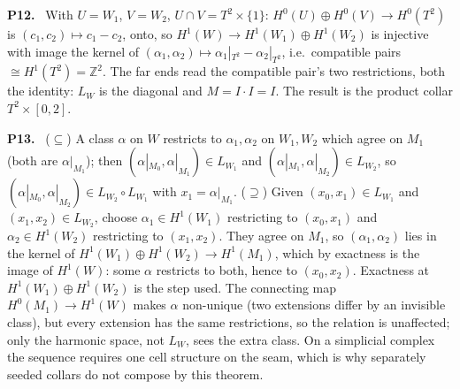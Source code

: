 \documentclass[11pt]{article}
\newcommand{\Z}{\mathbb{Z}}
\newenvironment{solution}[1]{\medskip\noindent\textbf{P#1.}\ }{\par\medskip}
\begin{document}
\begin{solution}{12}
With $U = W_1$, $V = W_2$, $U\cap V = T^2\times\{1\}$: $H^0(U)\oplus H^0(V)\to H^0(T^2)$
is $(c_1,c_2)\mapsto c_1-c_2$, onto, so $H^1(W)\to H^1(W_1)\oplus H^1(W_2)$ is
injective with image the kernel of $(\alpha_1,\alpha_2)\mapsto\alpha_1|_{T^2}-\alpha_2|_{T^2}$,
i.e.\ compatible pairs $\cong H^1(T^2) = \Z^2$. The far ends read the compatible
pair's two restrictions, both the identity: $L_W$ is the diagonal and
$M = I\cdot I = I$. The result is the product collar $T^2\times[0,2]$.
\end{solution}

\begin{solution}{13}
($\subseteq$) A class $\alpha$ on $W$ restricts to $\alpha_1,\alpha_2$ on $W_1,W_2$
which agree on $M_1$ (both are $\alpha|_{M_1}$); then $(\alpha|_{M_0},\alpha|_{M_1})\in L_{W_1}$
and $(\alpha|_{M_1},\alpha|_{M_2})\in L_{W_2}$, so $(\alpha|_{M_0},\alpha|_{M_2})\in L_{W_2}\circ L_{W_1}$
with $x_1 = \alpha|_{M_1}$. ($\supseteq$) Given $(x_0,x_1)\in L_{W_1}$ and $(x_1,x_2)\in L_{W_2}$,
choose $\alpha_1\in H^1(W_1)$ restricting to $(x_0,x_1)$ and $\alpha_2\in H^1(W_2)$
restricting to $(x_1,x_2)$. They agree on $M_1$, so $(\alpha_1,\alpha_2)$ lies in
the kernel of $H^1(W_1)\oplus H^1(W_2)\to H^1(M_1)$, which by exactness is the
image of $H^1(W)$: some $\alpha$ restricts to both, hence to $(x_0,x_2)$. Exactness
at $H^1(W_1)\oplus H^1(W_2)$ is the step used. The connecting map
$H^0(M_1)\to H^1(W)$ makes $\alpha$ non-unique (two extensions differ by an
invisible class), but every extension has the same restrictions, so the
relation is unaffected; only the harmonic space, not $L_W$, sees the extra
class. On a simplicial complex the sequence requires one cell structure on
the seam, which is why separately seeded collars do not compose by this
theorem.
\end{solution}
\end{document}
